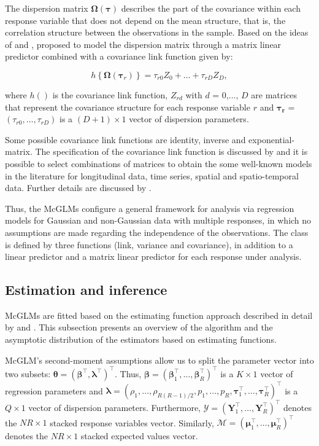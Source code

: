 \documentclass[article]{jss}\usepackage[]{graphicx}\usepackage[]{xcolor}
\begin{document}
The dispersion matrix $\boldsymbol{\Omega({\tau})}$ describes the part of the covariance within each response variable that does not depend on the mean structure, that is, the correlation structure between the observations in the sample. Based on the ideas of \citet{Anderson73} and \citet{Pourahmadi00}, \citet{Bonat16} proposed to model the dispersion matrix through a matrix linear predictor combined with a covariance link function given by:

$$
h\left \{ \boldsymbol{\Omega}(\boldsymbol{\tau}_r) \right \} = \tau_{r0}Z_0 + \ldots + \tau_{rD}Z_D,
$$

\noindent where $h()$ is the covariance link function, $Z_{rd}$ with $d$ = 0,$\ldots$, $D$ are matrices that represent the covariance structure for each response variable $r$ and $\boldsymbol{\tau_r}$ = $(\tau_{r0}, \ldots, \tau_{rD})$ is a $(D + 1) \times 1$ vector of dispersion parameters. 

Some possible covariance link functions are identity, inverse and exponential-matrix. The specification of the covariance link function is discussed by \citet{Pinheiro96} and it is possible to select combinations of matrices to obtain the some well-known models in the literature for longitudinal data, time series, spatial and spatio-temporal data. Further details are discussed by \citet{Demidenko13}.

Thus, the McGLMs configure a general framework for analysis via regression models for Gaussian and non-Gaussian data with multiple responses, in which no assumptions are made regarding the independence of the observations. The class is defined by three functions (link, variance and covariance), in addition to a linear predictor and a matrix linear predictor for each response under analysis. 

\subsection{Estimation and inference}\label{sec:inf}

McGLMs are fitted based on the estimating function approach described in detail by \citet{Bonat16} and \citet{jorg04}. This subsection presents an overview of the algorithm and the asymptotic distribution of the estimators based on estimating functions.

McGLM's second-moment assumptions allow us to split the parameter vector into two subsets: $\boldsymbol{\theta} = (\boldsymbol{\beta}^{\top}, \boldsymbol{\lambda}^{\top})^{\top}$. Thus, $\boldsymbol{\beta} = (\boldsymbol{\beta}_1^\top, \ldots, \boldsymbol{\beta}_R^\top)^\top$ is a  $K \times 1$ vector of regression parameters and $\boldsymbol{\lambda} = (\rho_1, \ldots, \rho_{R(R-1)/2}, p_1, \ldots, p_R, \boldsymbol{\tau}_1^\top, \ldots, \boldsymbol{\tau}_R^\top)^\top$ is a $Q \times 1$ vector of dispersion parameters. Furthermore, $\mathcal{Y} = (\boldsymbol{Y}_1^\top, \ldots, \boldsymbol{Y}_R^\top)^\top$ denotes the $NR \times 1$ stacked response variables vector. Similarly, $\mathcal{M} = (\boldsymbol{\mu}_1^\top, \ldots, \boldsymbol{\mu}_R^\top)^\top$ denotes the $NR \times 1$ stacked expected values vector. 
\end{document}
